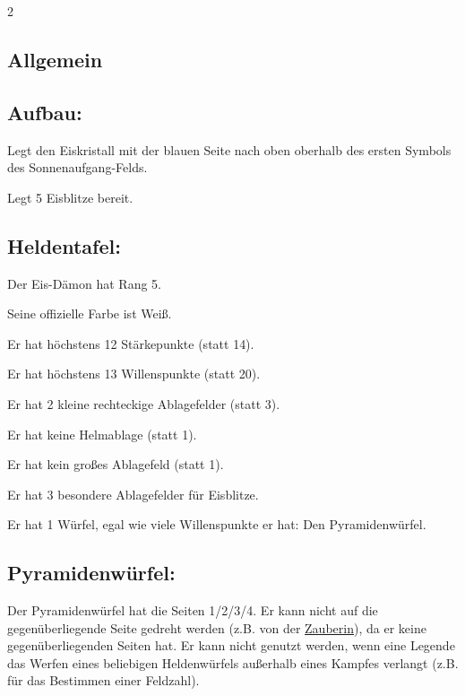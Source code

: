 \documentclass[10pt, a4paper, oneside]{book}
\begin{document}
\begin{multicols*}{2}\raggedcolumns


\begin{nobgcolor}

\section{Allgemein}



\subsection{Aufbau:} 

Legt den Eiskristall mit der blauen Seite nach oben oberhalb des ersten Symbols des Sonnenaufgang-Felds.
\supercite{MH:Kälte,MH:Begleitheft}

Legt 5 Eisblitze bereit.





\subsection{Heldentafel:}

Der Eis-Dämon hat Rang 5.

Seine offizielle Farbe ist Weiß.

Er hat höchstens 12 Stärkepunkte (statt 14).

Er hat höchstens 13 Willenspunkte (statt 20).

Er hat 2 kleine rechteckige Ablagefelder (statt 3).

Er hat keine Helmablage (statt 1).

Er hat kein großes Ablagefeld (statt 1).

Er hat 3 besondere Ablagefelder für Eisblitze.

Er hat 1 Würfel, egal wie viele Willenspunkte er hat: Den Pyramidenwürfel. 





\subsection{Pyramidenwürfel:}

Der Pyramidenwürfel hat die Seiten 1/2/3/4. Er kann nicht auf die gegenüberliegende Seite gedreht werden (z.B. von der \hyperref[Zauberin]{Zauberin}), da er keine gegenüberliegenden Seiten hat.
\supercite{91842}
Er kann nicht genutzt werden, wenn eine Legende das Werfen eines beliebigen Heldenwürfels außerhalb eines Kampfes verlangt (z.B. für das Bestimmen einer Feldzahl).
\supercite{88552}





\end{nobgcolor}
\end{multicols*}
\end{document}
